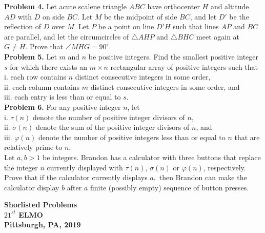 \documentclass[12pt,a4paper]{article}
\begin{document}
\textbf{Problem 4.} Let acute scalene triangle \(ABC\) have orthocenter \(H\) and altitude \(AD\) with \(D\) on side \(BC.\) Let \(M\) be the midpoint of side \(BC\), and let \(D'\) be the reflection of \(D\) over \(M.\) Let \(P\) be a point on line \(D'H\) such that lines \(AP\) and \(BC\) are parallel, and let the circumcircles  of \(\bigtriangleup AHP\) and \(\bigtriangleup BHC\) meet again at \(G \ne H.\) Prove that  \(\angle MHG = {90^ \circ }.\)\\
\newline
\textbf{Problem 5.} Let \(m\) and \(n\) be positive integers. Find the smallest positive integer \(s\) for which there exists an \(m \times n\) rectangular array of positive integers such that\\
i. each row contains \(n\) distinct consecutive integers in some order, \\
ii. each column contains \(m\) distinct consecutive integers in some order, and\\
iii. each entry is less than or equal to \(s.\)\\
\newline
\textbf{Problem 6.} For any positive integer \(n\), let \\
i. \(\tau \left( n \right)\) denote the number of positive integer divisors of \(n\),\\
ii. \(\sigma \left( n \right)\) denote the sum of the positive integer divisors of \(n\), and\\
iii. \(\varphi \left( n \right)\) denote the number of positive integers less than or equal to \(n\) that are relatively prime to \(n.\)\\
Let \(a, b > 1\) be integers. Brandon has a calculator with three buttons that replace the integer \(n\) currently displayed with \(\tau \left( n \right)\), \(\sigma \left( n \right)\) or \(\varphi \left( n \right)\), respectively. Prove that if the calculator currently displays \(a,\) then Brandon can make the calculator display \(b\) after \(a\) finite (possibly empty) sequence of button presses.
\newpage
\begin{center}
\fontsize{18}{16}\selectfont
\textbf{Shorlisted Problems}\\
\fontsize{16}{14}\selectfont
\textbf{\({21^{st}}\) ELMO\\
Pittsburgh, PA, 2019}
\end{center}
\end{document}
